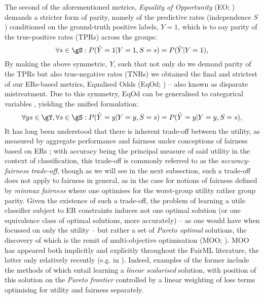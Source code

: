 %
%
The second of the aforementioned metrics, \emph{Equality of Opportunity} (EO;
\cite{hardt2016equality}) demands a stricter form of parity, namely of the predictive rates
(independence \wrt{} \(S\)) conditioned on the ground-truth positive labels, \(Y=1\), which is to
say parity of the true-positive rates (TPRs) across the groups:
%
\begin{equation}
    \forall s \in \gS: P( \hat{Y}=1|Y=1, S=s ) = P(\hat{Y}|Y=1),
\end{equation}
%
By making the above symmetric, \wrt{} \(Y\), such that not only do we demand parity of the TPRs but
also true-negative rates (TNRs) we obtained the final and strictest of our ERs-based metrics, Equalised Odds
(EqOd; \cite{woodworth2017learning}) -- also known as disparate mistreatment.
%
Due to this symmetry, EqOd can be generalised to categorical variables
\citep{woodworth2017learning}, yielding the unified formulation:
%
\begin{equation}
    \forall y s \in \gY, \forall s \in \gS: P( \hat{Y}=y|Y=y, S=s ) = P(\hat{Y}=y|Y=y, S=s),
\end{equation}
%
%
It has long been understood that there is inherent trade-off between the utility, as measured by
aggregate performance and fairness under conceptions of fairness based on ERs
\cite{kaplow1999conflict}; with accuracy being the principal measure of said utility in the context
of classification, this trade-off is commonly referred to as the \emph{accuracy-fairness
trade-off}, though as we will see in the next subsection, such a trade-off does not apply to
fairness in general, as in the case for notions of fairness defined by \emph{minmax fairness} where
one optimises for the worst-group utility rather group parity.
%
Given the existence of such a trade-off, the problem of learning a utile classifier subject to
ER constraints induces not one optimal solution (or one equivalence class of optimal solutions,
more accurately) -- as one would have when focussed on only the utility -- but rather a set of
\emph{Pareto optimal} solutions, the discovery of which is the remit of multi-objective
optimisation (MOO; \cite{sawaragi1985theory, deb2013multi}). 
%
MOO has appeared both implicitly and explicitly throughout the FairML literature, the latter only
relatively recently (e.g. in \cite{navon2020learning}). 
%
Indeed, examples of the former include the methods of \cite{louizos2015variational,
madras2018learning} which entail learning a \emph{linear scalarised} solution,  with position of
this solution on the \emph{Pareto frontier} controlled by a linear weighting of loss terms
optimising for utility and fairness separately.

